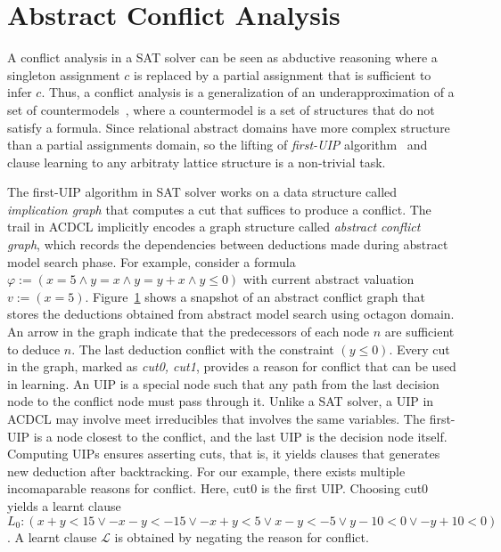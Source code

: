 \section{Abstract Conflict Analysis}
A conflict analysis in a SAT solver can be seen as abductive 
reasoning where a singleton assignment $c$ is replaced by a partial 
assignment that is sufficient to infer $c$.  Thus, a conflict 
analysis is a generalization of an underapproximation of a set of 
countermodels~\cite{sas,dhk2013-popl}, where a countermodel is a 
set of structures that do not satisfy a formula.  Since relational 
abstract domains have more complex structure than a partial 
assignments domain, so the lifting of {\em first-UIP} algorithm~\cite{uip} 
and clause learning to any arbitraty lattice structure is a non-trivial task. 

The first-UIP algorithm in SAT solver works on a data structure called 
{\em implication graph} that computes a cut that suffices to produce a 
conflict.  The trail in ACDCL implicitly encodes a graph structure called 
{\em abstract conflict graph}, which records the dependencies between 
deductions made during abstract model search phase.  For example, consider a
formula $\varphi:= (x=5 \wedge y=x \wedge y=y+x \wedge y \leq 0)$ with current 
abstract valuation $v:= (x=5)$.  
Figure~\ref{conflict} shows a snapshot of an abstract conflict graph that 
stores the deductions obtained from abstract model search using octagon domain.  
An arrow in the graph indicate that the predecessors of each node $n$ are 
sufficient to deduce $n$.  The last deduction conflict with the constraint 
$(y \leq 0)$.  Every cut in the graph, marked as {\em cut0, cut1}, provides a 
reason for conflict that can be used in learning.  An UIP is a special node such 
that any path from the last decision node to the conflict node must pass 
through it.  Unlike a SAT solver, a UIP in ACDCL may involve meet irreducibles 
that involves the same variables.  The first-UIP is a node closest to the 
conflict, and the last UIP is the decision node itself.  Computing UIPs ensures 
asserting cuts, that is, it yields clauses that generates new deduction after 
backtracking.  For our example, there exists multiple incomaparable reasons 
for conflict.  Here, cut0 is the first UIP.  Choosing cut0 yields a learnt 
clause $L_0: (x+y<15 \vee -x-y<-15 \vee -x+y<5 \vee x-y<-5 \vee y-10<0 \vee 
-y+10<0)$.  A learnt clause $\mathcal{L}$ is obtained by negating the reason 
for conflict.  
%
\begin{figure}
\label{conflict}
\end{figure} 
%    
